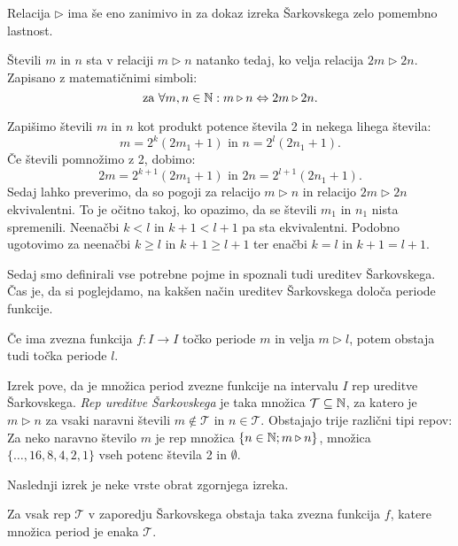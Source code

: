 \documentclass[../TG_magistrsko_delo_sections.tex]{subfiles}
\begin{document}
Relacija $\triangleright$ ima še eno zanimivo in za dokaz izreka Šarkovskega zelo pomembno lastnost.
\begin{trditev}\label{trd:doubling}
Števili $m$ in $n$ sta v relaciji $m \triangleright n$ natanko tedaj, ko velja relacija $2m \triangleright 2n$. Zapisano z matematičnimi simboli:
$$\text{za } \forall m, n \in \mathbb N: m \triangleright n \Leftrightarrow 2m \triangleright 2n.$$
\end{trditev}
\begin{dokaz}
Zapišimo števili $m$ in $n$ kot produkt potence števila 2 in nekega lihega števila:
$$m= 2^k(2m_1 +1)\text{ in } n= 2^l(2n_1 +1).$$
Če števili pomnožimo z 2, dobimo:
$$2m= 2^{k+1}(2m_1 +1)\text{ in } 2n= 2^{l+1}(2n_1 +1).$$
Sedaj lahko preverimo, da so pogoji za relacijo $m \triangleright n$ in relacijo $2m \triangleright 2n$ ekvivalentni. To je očitno takoj, ko opazimo, da se števili $m_1$ in $n_1$ nista spremenili. Neenačbi $k<l$ in $k+1<l+1$ pa sta ekvivalentni. Podobno ugotovimo za neenačbi $k \geq l$ in $k+1 \geq l+1$ ter enačbi $k=l$ in $k+1 = l+1$.
\end{dokaz}

Sedaj smo definirali vse potrebne pojme in spoznali tudi ureditev Šarkovskega. Čas je, da si poglejdamo, na kakšen način ureditev Šarkovskega določa periode funkcije.

\begin{izrek}\label{izr:forcing}
Če ima zvezna funkcija $f : I \to I$ točko periode $m$ in velja $ m \triangleright l$, potem obstaja tudi točka periode $l$.
\end{izrek}
Izrek pove, da je množica period zvezne funkcije na intervalu $I$ rep ureditve Šarkovskega. \emph{Rep ureditve Šarkovskega} je taka množica $\mathcal{T} \subseteq \mathbb N$, za katero je $m \triangleright n$ za  vsaki naravni števili $m \notin \mathcal{T}$ in $n \in \mathcal{T}$. Obstajajo trije različni tipi repov:  Za neko naravno število $m$ je rep množica $\{n \in \mathbb N; m \triangleright n\}$, množica $\{\dots, 16, 8, 4, 2, 1\}$ vseh potenc števila 2 in $\emptyset$.

Naslednji izrek je neke vrste obrat zgornjega izreka.

\begin{izrek}\label{izr:realization}
Za vsak rep $\mathcal{T}$ v zaporedju Šarkovskega obstaja taka zvezna funkcija $f$, katere množica period je enaka $\mathcal{T}$.
\end{izrek}
\end{document}
